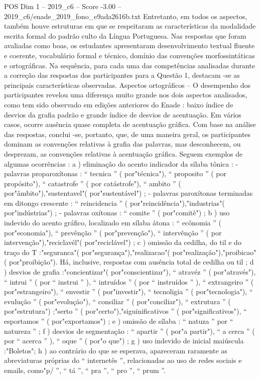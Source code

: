 \begin{textsample}{POS Dim 1 – 2019\_c6 – Score -3.00 – 2019\_c6/enade\_2019\_fono\_e9ada2616b.txt}
Entretanto, em todos os aspectos, também houve estruturas em que se respeitaram as características da modalidade escrita formal do padrão culto da Língua Portuguesa.
Nas respostas que foram avaliadas como boas, os estudantes apresentaram desenvolvimento textual fluente e coerente, vocabulário formal e técnico, domínio das convenções morfossintáticas e ortográficas.
Na sequência, para cada uma das competências analisadas durante a correção das respostas dos participantes para a Questão 1, destacam -se as principais características observadas.
Aspectos ortográficos – O desempenho dos participantes revelou uma diferença muito grande nos dois aspectos analisados, como tem sido observado em edições anteriores do Enade : baixo índice de desvios da grafia padrão e grande índice de desvios de acentuação.
Em vários casos, ocorre ausência quase completa de acentuação gráfica.
Com base na análise das respostas, conclui -se, portanto, que, de uma maneira geral, os participantes dominam as convenções relativas à grafia das palavras, mas desconhecem, ou desprezam, as convenções relativas à acentuação gráfica.
Seguem exemplos de algumas ocorrências : a ) eliminação do acento indicador da sílaba tônica : - palavras proparoxítonas : “ tecnica ” ( por"técnica"), “ proposito ” ( por propósito"), “ catastrofe ” ( por catástrofe"), “ ambito ” ( por"âmbito"),"sustentavel"( por"sustentável") ; - palavras paroxítonas terminadas em ditongo crescente : “ reincidencia ” ( por"reincidência"),"industrias"( por"indústrias") ; - palavras oxítonas : “ comite ” ( por"comitê") ; b ) uso indevido do acento gráfico, localizado em sílaba átona : “ ecônomia ” ( por"economia"), “ prevênção ” ( por"prevenção"), “ intervênção ” ( por intervenção"),"reciclavél"( por"reciclável") ; c ) omissão da cedilha, do til e do traço do T :"seguranca"( por"segurança"),"realizacao"( por"realização"),"proibicao"( por"proibição").
Há, inclusive, respostas com ausência total de cedilha ou til ; d ) desvios de grafia :"concientizar"( por"conscientizar"), “ atravéz ” ( por"através"), “ intrui ” ( por “ instrui ” ), “ intruídos ” ( por “ instruídos ” ), “ extrangeiro ” ( por"estrangeiro"), “ envestir ” ( por"investir"), “ tecnoligia ” ( por"tecnologia"), “ evulução ” ( por"evolução"), “ consiliar ” ( por"conciliar"), “ extrutura ” ( por"estrutura") ;"serto ” ( por"certo"),"siguinificativos ” ( por"significativos"), “ esportamos ” ( por"exportamos") ; e ) omissão de sílaba : “ natuza ” por “ natureza ” ; f ) desvios de segmentação : “ apartir ” ( por"a partir"), “ a cerca ” ( por “ acerca ” ), “ oque ” ( por"o que") ; g ) uso indevido de inicial maiúscula :"Boletos"; h ) ao contrário do que se esperava, apareceram raramente as abreviaturas próprias do “ internetês ”, relacionadas ao uso de redes sociais e emails, como"p/ ”, “ tá ”, “ pra ”, “ pro ”, “ prum ”.

\end{textsample}
